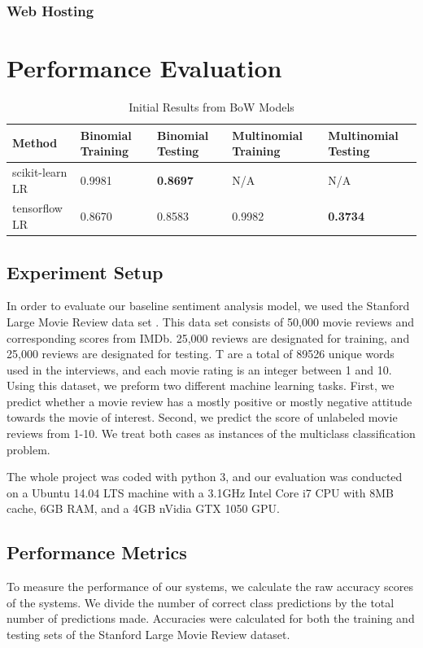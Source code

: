 \documentclass[conference]{IEEEtran}
\begin{document}
\subsubsection{Web Hosting}
\label{model:front:host}

\section{Performance Evaluation}
\label{performance}
    \begin{table}[]
        \centering
        \caption{Initial Results from BoW Models}
        \label{my-label}
        \begin{tabularx}{\textwidth}{ X  X  X X  X }
        \toprule
        Method & Binomial Training & Binomial Testing & Multinomial Training & Multinomial Testing \\
        \midrule
        scikit-learn LR & 0.9981 & \textbf{0.8697} & N/A & N/A \\
        tensorflow LR & 0.8670 & 0.8583 & 0.9982 & \textbf{0.3734} \\
        \bottomrule
        \end{tabularx}
    \end{table}
\subsection{Experiment Setup}
    In order to evaluate our baseline sentiment analysis model, we used the
    Stanford Large Movie Review data set \cite{maas2011learning}. This data
    set consists of 50,000 movie reviews and corresponding scores from IMDb.
    25,000 reviews are designated for training, and 25,000 reviews are designated for testing.
    T are a total of 89526 unique words used in the interviews, and each
    movie rating is an integer between 1 and 10. Using this dataset, we preform
    two different machine learning tasks. First, we predict whether a movie review
    has a mostly positive or mostly negative attitude towards the movie of interest. 
    Second, we predict the score of unlabeled movie reviews from 1-10. We treat
    both cases as instances of the multiclass classification problem.
    
    The whole project was coded with python 3, and our evaluation was conducted on
    a Ubuntu 14.04 LTS machine with a 3.1GHz Intel Core i7 CPU with 8MB cache,
    6GB RAM, and a 4GB nVidia GTX 1050 GPU.
    
\subsection{Performance Metrics}
    To measure the performance of our systems, we calculate the raw accuracy
    scores of the systems. We divide the number of correct class predictions
    by the total number of predictions made. Accuracies were calculated
    for both the training and testing sets of the Stanford Large Movie Review dataset.
    
\end{document}
